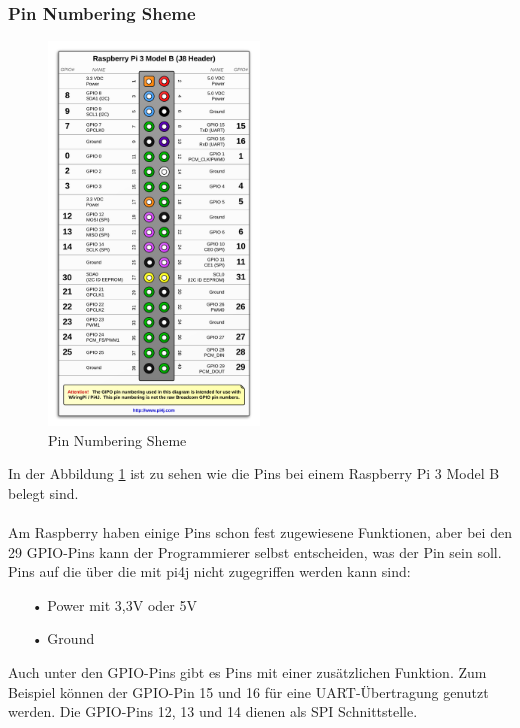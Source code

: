 \newpage

\subsubsection{Pin Numbering Sheme}

\begin{figure}
\vspace{-35pt}
  \begin{center}
    \includegraphics[width=0.50\textwidth]{Bilder/pi4j/PinNumberingSheme}
  \end{center}
  \caption[Pin Numbering Sheme]{Pin Numbering Sheme\protect\footnotemark}
  \label{Pin Numbering Sheme}
  \vspace{-180pt}
\end{figure}


In der Abbildung \ref{Pin Numbering Sheme} ist zu sehen wie die Pins bei einem Raspberry Pi 3 Model B belegt sind.
\\ \\
Am Raspberry haben einige Pins schon fest zugewiesene Funktionen, aber bei den 29 GPIO-Pins kann der Programmierer selbst entscheiden, was der Pin sein soll.
\\Pins auf die über die mit pi4j nicht zugegriffen werden kann sind:
\begin{itemize}
\item[•] Power mit 3,3V oder 5V
\item[•] Ground
\end{itemize}
\vspace{10pt}
Auch unter den GPIO-Pins gibt es Pins mit einer zusätzlichen Funktion. Zum Beispiel können der GPIO-Pin 15 und 16 für eine UART-Übertragung genutzt werden. Die GPIO-Pins 12, 13 und 14 dienen als SPI Schnittstelle.

